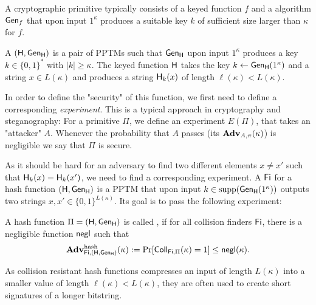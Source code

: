 A cryptographic primitive typically consists of a keyed function $f$ and
a  algorithm $\operatorname{\mathsf{Gen}}_{f}$ that upon input $1^{\kappa}$
produces a suitable key $k$ of sufficient size larger than $\kappa$ for
$f$. 

A  $(\operatorname{\mathsf{H}},\operatorname{\mathsf{Gen}}_{\operatorname{\mathsf{H}}})$ is a pair of \acp{PPTM} such that
$\operatorname{\mathsf{Gen}}_{\operatorname{\mathsf{H}}}$ upon input $1^{\kappa}$ produces a key $k\in \{0,1\}^{*}$
with $|k|\geq \kappa$. The keyed function $\operatorname{\mathsf{H}}$ takes the key $k\gets
\operatorname{\mathsf{Gen}}_{\operatorname{\mathsf{H}}}(1^{\kappa})$ and a string $x\in L(\kappa)$ and produces a
string $\operatorname{\mathsf{H}}_{k}(x)$ of length $\ell(\kappa) < L(\kappa)$.

 In order to define the
"security" of this function, we first need to define a corresponding
\emph{experiment}. This is a typical approach in cryptography and
steganography: For a primitive $\Pi$, we define an experiment $E(\Pi)$,
that takes an "attacker" $A$. Whenever the probability that $A$ passes
(its  $\operatorname{\mathbf{Adv}}_{A,\pi}(\kappa)$) 
is negligible we say that $\Pi$ is secure. 

As it should be hard for an
adversary to find two different elements $x\neq x'$ such that
$\operatorname{\mathsf{H}}_{k}(x)=\operatorname{\mathsf{H}}_{k}(x')$, we need to find a corresponding experiment. A
 $\operatorname{\mathsf{Fi}}$ for a hash function $(\operatorname{\mathsf{H}},\operatorname{\mathsf{Gen}}_{\operatorname{\mathsf{H}}})$
 is a \ac{PPTM} that upon input 
$k\in \operatorname{supp}(\operatorname{\mathsf{Gen}}_{\operatorname{\mathsf{H}}}(1^{\kappa}))$ outputs two strings
$x,x'\in \{0,1\}^{L(\kappa)}$. Its goal is to pass the following
experiment:

A hash function $\Pi=(\operatorname{\mathsf{H}},\operatorname{\mathsf{Gen}}_{\operatorname{\mathsf{H}}})$ is called
, if for all collision finders $\operatorname{\mathsf{Fi}}$, there is a
negligible function $\operatorname{\mathsf{negl}}$ such that
\begin{align*}
 \operatorname{\mathbf{Adv}}_{\operatorname{\mathsf{Fi}},(\operatorname{\mathsf{H}},\operatorname{\mathsf{Gen}}_{\operatorname{\mathsf{H}}})}^{\operatorname{hash}}(\kappa) := \Pr[\operatorname{\mathsf{Coll}}_{\operatorname{\mathsf{Fi}},\Pi}(\kappa)=1]\leq \operatorname{\mathsf{negl}}(\kappa).
\end{align*}

As collision resistant hash functions compresses an input of length
$L(\kappa)$ into a smaller value of length $\ell(\kappa) < L(\kappa)$, they
are often used to create short signatures of a longer bitstring.

